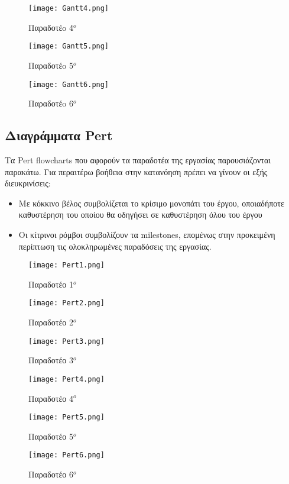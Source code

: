 \documentclass{article}
\begin{document}
\begin{figure}[!htb]
\centering
\texttt{[image: Gantt4.png]}
\caption{\label{fig:Gannt4} Παραδοτέo 4$^o$}
\end{figure}

\newpage

\begin{figure}[!htb]
\centering
\texttt{[image: Gantt5.png]}
\caption{\label{fig:Gannt5} Παραδοτέo 5$^o$}
\end{figure}

\begin{figure}[!htb]
\centering
\texttt{[image: Gantt6.png]}
\caption{\label{fig:Gannt6} Παραδοτέo 6$^o$}
\end{figure}


\subsection{Διαγράμματα Pert}

Τα Pert flowcharts που αφορούν τα παραδοτέα της εργασίας παρουσιάζονται παρακάτω. Για περαιτέρω βοήθεια στην κατανόηση πρέπει να γίνουν οι εξής διευκρινίσεις:

\begin{itemize}
  \item Με κόκκινο βέλος συμβολίζεται το κρίσιμο μονοπάτι του έργου, οποιαδήποτε καθυστέρηση του οποίου θα οδηγήσει σε καθυστέρηση όλου του έργου
  \item Οι κίτρινοι ρόμβοι συμβολίζουν τα milestones, επομένως στην προκειμένη περίπτωση τις ολοκληρωμένες παραδόσεις της εργασίας.
\end{itemize}

\begin{figure}[!htb]
\centering
\texttt{[image: Pert1.png]}
\caption{\label{fig:Pert1} Παραδοτέο 1$^o$}
\end{figure}

\newpage

\begin{figure}[!htb]
\centering
\texttt{[image: Pert2.png]}
\caption{\label{fig:Pert2} Παραδοτέο 2$^o$}
\end{figure}

\begin{figure}[!htb]
\centering
\texttt{[image: Pert3.png]}
\caption{\label{fig:Pert3} Παραδοτέο 3$^o$}
\end{figure}

\begin{figure}[!htb]
\centering
\texttt{[image: Pert4.png]}
\caption{\label{fig:Pert4} Παραδοτέο 4$^o$}
\end{figure}

\newpage

\begin{figure}[!htb]
\centering
\texttt{[image: Pert5.png]}
\caption{\label{fig:Pert5} Παραδοτέο 5$^o$}
\end{figure}

\begin{figure}[!htb]
\centering
\texttt{[image: Pert6.png]}
\caption{\label{fig:Pert6} Παραδοτέο 6$^o$}
\end{figure}
\end{document}
